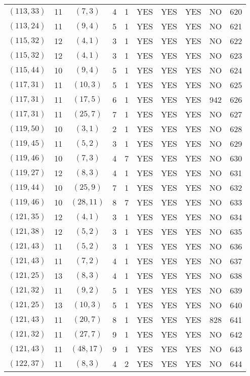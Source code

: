 \begin{longtable}{|c|c|c|c|c|c|c|c|c|c|}
$(113, 33)$ & 11 & $(7, 3)$ & 4 & 1 & YES & YES & YES & NO & 620\\
$(113, 24)$ & 11 & $(9, 4)$ & 5 & 1 & YES & YES & YES & NO & 621\\
$(115, 32)$ & 12 & $(4, 1)$ & 3 & 1 & YES & YES & YES & NO & 622\\
$(115, 32)$ & 12 & $(4, 1)$ & 3 & 1 & YES & YES & YES & NO & 623\\
$(115, 44)$ & 10 & $(9, 4)$ & 5 & 1 & YES & YES & YES & NO & 624\\
$(117, 31)$ & 11 & $(10, 3)$ & 5 & 1 & YES & YES & YES & NO & 625\\
$(117, 31)$ & 11 & $(17, 5)$ & 6 & 1 & YES & YES & YES & 942 & 626\\
$(117, 31)$ & 11 & $(25, 7)$ & 7 & 1 & YES & YES & YES & NO & 627\\
$(119, 50)$ & 10 & $(3, 1)$ & 2 & 1 & YES & YES & YES & NO & 628\\
$(119, 45)$ & 11 & $(5, 2)$ & 3 & 1 & YES & YES & YES & NO & 629\\
$(119, 46)$ & 10 & $(7, 3)$ & 4 & 7 & YES & YES & YES & NO & 630\\
$(119, 27)$ & 12 & $(8, 3)$ & 4 & 1 & YES & YES & YES & NO & 631\\
$(119, 44)$ & 10 & $(25, 9)$ & 7 & 1 & YES & YES & YES & NO & 632\\
$(119, 46)$ & 10 & $(28, 11)$ & 8 & 7 & YES & YES & YES & NO & 633\\
$(121, 35)$ & 12 & $(4, 1)$ & 3 & 1 & YES & YES & YES & NO & 634\\
$(121, 38)$ & 12 & $(5, 2)$ & 3 & 1 & YES & YES & YES & NO & 635\\
$(121, 43)$ & 11 & $(5, 2)$ & 3 & 1 & YES & YES & YES & NO & 636\\
$(121, 43)$ & 11 & $(7, 2)$ & 4 & 1 & YES & YES & YES & NO & 637\\
$(121, 25)$ & 13 & $(8, 3)$ & 4 & 1 & YES & YES & YES & NO & 638\\
$(121, 32)$ & 11 & $(9, 2)$ & 5 & 1 & YES & YES & YES & NO & 639\\
$(121, 25)$ & 13 & $(10, 3)$ & 5 & 1 & YES & YES & YES & NO & 640\\
$(121, 43)$ & 11 & $(20, 7)$ & 8 & 1 & YES & YES & YES & 828 & 641\\
$(121, 32)$ & 11 & $(27, 7)$ & 9 & 1 & YES & YES & YES & NO & 642\\
$(121, 43)$ & 11 & $(48, 17)$ & 9 & 1 & YES & YES & YES & NO & 643\\
$(122, 37)$ & 11 & $(8, 3)$ & 4 & 2 & YES & YES & YES & NO & 644\\

\end{longtable}
